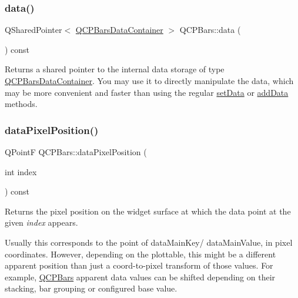 \mbox{\label{class_q_c_p_bars_a7e373a534d82e18ed27b3fafd1f08fae}} 
\subsubsection{\texorpdfstring{data()}{data()}}
{\footnotesize\ttfamily Q\+Shared\+Pointer$<$ \mbox{\hyperlink{qcustomplot_8h_a52bf589c9fce1baa36c1d40d69785d46}{Q\+C\+P\+Bars\+Data\+Container}} $>$ Q\+C\+P\+Bars\+::data (\begin{DoxyParamCaption}{ }\end{DoxyParamCaption}) const\hspace{0.3cm}{\ttfamily [inline]}}

Returns a shared pointer to the internal data storage of type \mbox{\hyperlink{qcustomplot_8h_a52bf589c9fce1baa36c1d40d69785d46}{Q\+C\+P\+Bars\+Data\+Container}}. You may use it to directly manipulate the data, which may be more convenient and faster than using the regular \mbox{\hyperlink{class_q_c_p_bars_a6dc562ec7120a8521e1061f2134367e4}{set\+Data}} or \mbox{\hyperlink{class_q_c_p_bars_a323d6970d6d6e3166d89916a7f60f733}{add\+Data}} methods. \mbox{\label{class_q_c_p_bars_a55cdaf565cd3384158d1f7f89533bc2d}} 
\subsubsection{\texorpdfstring{dataPixelPosition()}{dataPixelPosition()}}
{\footnotesize\ttfamily Q\+PointF Q\+C\+P\+Bars\+::data\+Pixel\+Position (\begin{DoxyParamCaption}\item[{int}]{index }\end{DoxyParamCaption}) const\hspace{0.3cm}{\ttfamily [virtual]}}





Returns the pixel position on the widget surface at which the data point at the given {\itshape index} appears.

Usually this corresponds to the point of data\+Main\+Key/ data\+Main\+Value, in pixel coordinates. However, depending on the plottable, this might be a different apparent position than just a coord-\/to-\/pixel transform of those values. For example, \mbox{\hyperlink{class_q_c_p_bars}{Q\+C\+P\+Bars}} apparent data values can be shifted depending on their stacking, bar grouping or configured base value. 

